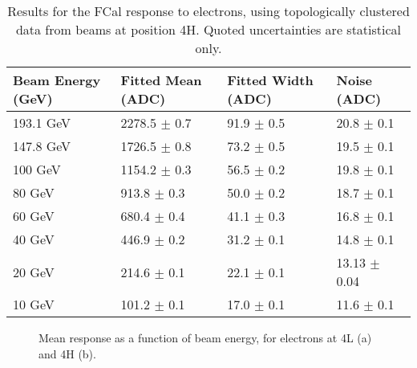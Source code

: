 \begin{table}[tb]
\begin{center}
\begin{tabular}{|l|l|l|l|}
\hline
Beam Energy (GeV) & Fitted Mean (ADC)& Fitted Width (ADC)& Noise (ADC) \\
\hline
193.1 GeV  &  2278.5 $\pm$     0.7 &    91.9 $\pm$     0.5 &    20.8 $\pm$     0.1 \\
147.8 GeV  &  1726.5 $\pm$     0.8 &    73.2 $\pm$     0.5 &    19.5 $\pm$     0.1 \\
100 GeV  &  1154.2 $\pm$     0.3 &    56.5 $\pm$     0.2 &    19.8 $\pm$     0.1 \\
80 GeV  &   913.8 $\pm$     0.3 &    50.0 $\pm$     0.2 &    18.7 $\pm$     0.1 \\
60 GeV  &   680.4 $\pm$     0.4 &    41.1 $\pm$     0.3 &    16.8 $\pm$     0.1 \\
40 GeV  &   446.9 $\pm$     0.2 &    31.2 $\pm$     0.1 &    14.8 $\pm$     0.1 \\
20 GeV  &   214.6 $\pm$     0.1 &    22.1 $\pm$     0.1 &    13.13 $\pm$     0.04 \\
10 GeV  &   101.2 $\pm$     0.1 &    17.0 $\pm$     0.1 &    11.6 $\pm$     0.1 \\
\hline
\end{tabular}
\end{center}
\caption[Electron response at 4H, topoclusters]{Results for the FCal response to electrons, using topologically clustered data from beams at position 4H. Quoted uncertainties are statistical only.}

\label{table_electron_response_4H_t420}
\end{table}

\begin{figure}[tbp]
\begin{centering}
\caption[Electron linearity, topoclusters]{Mean response as a function of beam energy, for electrons at 4L (a) and 4H (b). } 
\label{electron_linearity_t420}
\end{centering}
\end{figure}

